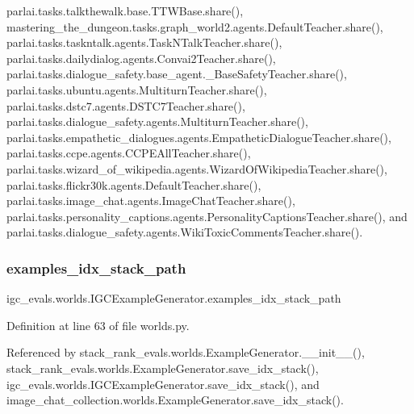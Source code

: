 parlai.\+tasks.\+talkthewalk.\+base.\+T\+T\+W\+Base.\+share(), mastering\+\_\+the\+\_\+dungeon.\+tasks.\+graph\+\_\+world2.\+agents.\+Default\+Teacher.\+share(), parlai.\+tasks.\+taskntalk.\+agents.\+Task\+N\+Talk\+Teacher.\+share(), parlai.\+tasks.\+dailydialog.\+agents.\+Convai2\+Teacher.\+share(), parlai.\+tasks.\+dialogue\+\_\+safety.\+base\+\_\+agent.\+\_\+\+Base\+Safety\+Teacher.\+share(), parlai.\+tasks.\+ubuntu.\+agents.\+Multiturn\+Teacher.\+share(), parlai.\+tasks.\+dstc7.\+agents.\+D\+S\+T\+C7\+Teacher.\+share(), parlai.\+tasks.\+dialogue\+\_\+safety.\+agents.\+Multiturn\+Teacher.\+share(), parlai.\+tasks.\+empathetic\+\_\+dialogues.\+agents.\+Empathetic\+Dialogue\+Teacher.\+share(), parlai.\+tasks.\+ccpe.\+agents.\+C\+C\+P\+E\+All\+Teacher.\+share(), parlai.\+tasks.\+wizard\+\_\+of\+\_\+wikipedia.\+agents.\+Wizard\+Of\+Wikipedia\+Teacher.\+share(), parlai.\+tasks.\+flickr30k.\+agents.\+Default\+Teacher.\+share(), parlai.\+tasks.\+image\+\_\+chat.\+agents.\+Image\+Chat\+Teacher.\+share(), parlai.\+tasks.\+personality\+\_\+captions.\+agents.\+Personality\+Captions\+Teacher.\+share(), and parlai.\+tasks.\+dialogue\+\_\+safety.\+agents.\+Wiki\+Toxic\+Comments\+Teacher.\+share().

\mbox{\label{classigc__evals_1_1worlds_1_1IGCExampleGenerator_aa309ee59a607d747c0f9868951ecba0a}} 
\subsubsection{\texorpdfstring{examples\+\_\+idx\+\_\+stack\+\_\+path}{examples\_idx\_stack\_path}}
{\footnotesize\ttfamily igc\+\_\+evals.\+worlds.\+I\+G\+C\+Example\+Generator.\+examples\+\_\+idx\+\_\+stack\+\_\+path}



Definition at line 63 of file worlds.\+py.



Referenced by stack\+\_\+rank\+\_\+evals.\+worlds.\+Example\+Generator.\+\_\+\+\_\+init\+\_\+\+\_\+(), stack\+\_\+rank\+\_\+evals.\+worlds.\+Example\+Generator.\+save\+\_\+idx\+\_\+stack(), igc\+\_\+evals.\+worlds.\+I\+G\+C\+Example\+Generator.\+save\+\_\+idx\+\_\+stack(), and image\+\_\+chat\+\_\+collection.\+worlds.\+Example\+Generator.\+save\+\_\+idx\+\_\+stack().

